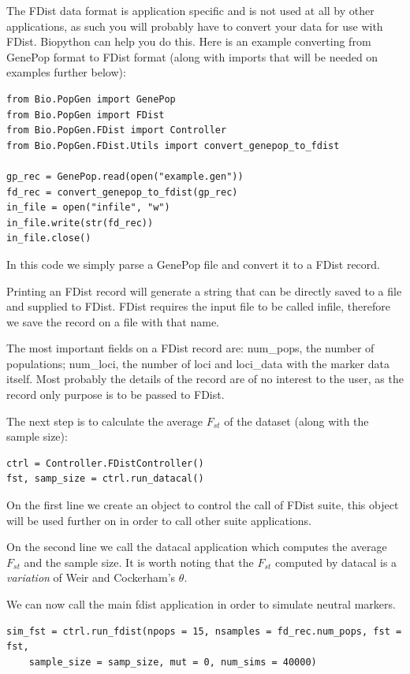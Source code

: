 \documentclass{report}
\begin{document}
The FDist data format is application specific and is not used at
all by other applications, as such you will probably have to convert
your data for use with FDist. Biopython can help you do this.
Here is an example converting from GenePop format to FDist format
(along with imports that will be needed on examples further below):

\begin{verbatim}
from Bio.PopGen import GenePop
from Bio.PopGen import FDist
from Bio.PopGen.FDist import Controller
from Bio.PopGen.FDist.Utils import convert_genepop_to_fdist

gp_rec = GenePop.read(open("example.gen"))
fd_rec = convert_genepop_to_fdist(gp_rec)
in_file = open("infile", "w")
in_file.write(str(fd_rec))
in_file.close()
\end{verbatim}

In this code we simply parse a GenePop file and convert it to a FDist
record.

Printing an FDist record will generate
a string that can be directly saved to a file and supplied to FDist. FDist
requires the input file to be called infile, therefore we save the record on
a file with that name.

The most important fields on a FDist record are: num\_pops, the number of
populations; num\_loci, the number of loci and loci\_data with the marker
data itself. Most probably the details of the record are of no interest
to the user, as the record only purpose is to be passed to FDist.

The next step is to calculate the average $F_{st}$ of the dataset (along
with the sample size):

\begin{verbatim}
ctrl = Controller.FDistController()
fst, samp_size = ctrl.run_datacal()
\end{verbatim}

On the first line we create an object to control the call of  FDist
suite, this object will be used further on in order to call other
suite applications.

On the second line we call the datacal application which computes the
average $F_{st}$
and the sample size. It is worth noting that the $F_{st}$ computed by
datacal is a \emph{variation} of Weir and Cockerham's $\theta$.

We can now call the main fdist application in order to simulate neutral
markers.

\begin{verbatim}
sim_fst = ctrl.run_fdist(npops = 15, nsamples = fd_rec.num_pops, fst = fst,
    sample_size = samp_size, mut = 0, num_sims = 40000)
\end{verbatim}
\end{document}
